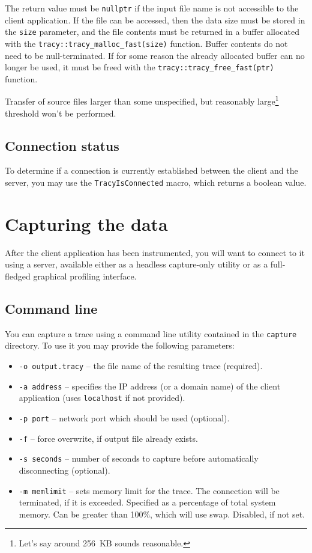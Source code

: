 \documentclass[hidelinks,titlepage,a4paper,twoside]{article}
\begin{document}
The return value must be \texttt{nullptr} if the input file name is not accessible to the client application. If the file can be accessed, then the data size must be stored in the \texttt{size} parameter, and the file contents must be returned in a buffer allocated with the \texttt{tracy::tracy\_malloc\_fast(size)} function. Buffer contents do not need to be null-terminated. If for some reason the already allocated buffer can no longer be used, it must be freed with the \texttt{tracy::tracy\_free\_fast(ptr)} function.

Transfer of source files larger than some unspecified, but reasonably large\footnote{Let's say around 256~KB sounds reasonable.} threshold won't be performed.

\subsection{Connection status}
\label{connectionstatus}

To determine if a connection is currently established between the client and the server, you may use the \texttt{TracyIsConnected} macro, which returns a boolean value.

\section{Capturing the data}
\label{capturing}

After the client application has been instrumented, you will want to connect to it using a server, available either as a headless capture-only utility or as a full-fledged graphical profiling interface.

\subsection{Command line}

You can capture a trace using a command line utility contained in the \texttt{capture} directory. To use it you may provide the following parameters:

\begin{itemize}
\item \texttt{-o output.tracy} -- the file name of the resulting trace (required).
\item \texttt{-a address} -- specifies the IP address (or a domain name) of the client application (uses \texttt{localhost} if not provided).
\item \texttt{-p port} -- network port which should be used (optional).
\item \texttt{-f} -- force overwrite, if output file already exists.
\item \texttt{-s seconds} -- number of seconds to capture before automatically disconnecting (optional).
\item \texttt{-m memlimit} -- sets memory limit for the trace. The connection will be terminated, if it is exceeded. Specified as a percentage of total system memory. Can be greater than 100\%, which will use swap. Disabled, if not set.
\end{itemize}
\end{document}
